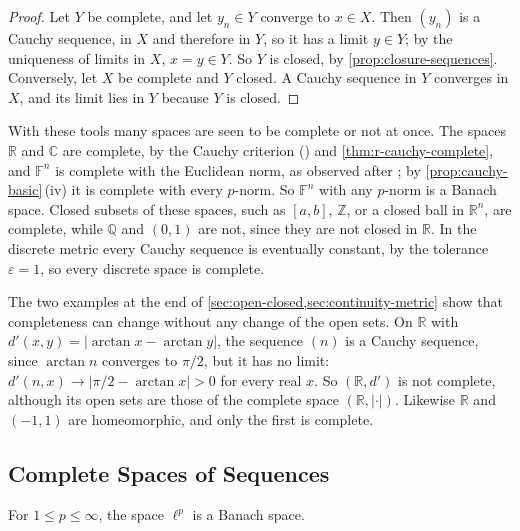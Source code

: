 \begin{proof}
Let $Y$ be complete, and let $y_n\in Y$ converge to $x\in X$. Then $(y_n)$ is a Cauchy sequence, in $X$ and therefore in $Y$, so it has a limit $y\in Y$; by the uniqueness of limits in $X$, $x=y\in Y$. So $Y$ is closed, by \cref{prop:closure-sequences}. Conversely, let $X$ be complete and $Y$ closed. A Cauchy sequence in $Y$ converges in $X$, and its limit lies in $Y$ because $Y$ is closed.
\end{proof}

With these tools many spaces are seen to be complete or not at once. The spaces $\mathbb R$ and $\mathbb C$ are complete, by the Cauchy criterion () and \cref{thm:r-cauchy-complete}, and $\mathbb F^n$ is complete with the Euclidean norm, as observed after ; by \cref{prop:cauchy-basic}\,(iv) it is complete with every $p$-norm. So $\mathbb F^n$ with any $p$-norm is a Banach space. Closed subsets of these spaces, such as $[a,b]$, $\mathbb Z$, or a closed ball in $\mathbb R^n$, are complete, while $\mathbb Q$ and $(0,1)$ are not, since they are not closed in $\mathbb R$. In the discrete metric every Cauchy sequence is eventually constant, by the tolerance $\varepsilon=1$, so every discrete space is complete.

The two examples at the end of \cref{sec:open-closed,sec:continuity-metric} show that completeness can change without any change of the open sets. On $\mathbb R$ with $d'(x,y)=|\arctan x-\arctan y|$, the sequence $(n)$ is a Cauchy sequence, since $\arctan n$ converges to $\pi/2$, but it has no limit: $d'(n,x)\to|\pi/2-\arctan x|>0$ for every real $x$. So $(\mathbb R,d')$ is not complete, although its open sets are those of the complete space $(\mathbb R,|\cdot|)$. Likewise $\mathbb R$ and $(-1,1)$ are homeomorphic, and only the first is complete.

\subsection{Complete Spaces of Sequences}

\begin{theorem}
\label{thm:lp-complete}
For $1\le p\le\infty$, the space $\ell^p$ is a Banach space.
\end{theorem}

